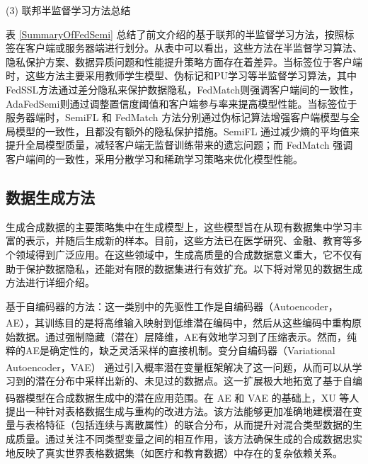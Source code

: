 (3) 联邦半监督学习方法总结

表 \ref{SummaryOfFedSemi} 总结了前文介绍的基于联邦的半监督学习方法，按照标签在客户端或服务器端进行划分。从表中可以看出，这些方法在半监督学习算法、隐私保护方案、数据异质问题和性能提升策略方面存在着差异。当标签位于客户端时，这些方法主要采用教师学生模型、伪标记和PU学习等半监督学习算法，其中FedSSL方法通过差分隐私来保护数据隐私，FedMatch则强调客户端间的一致性，AdaFedSemi则通过调整置信度阈值和客户端参与率来提高模型性能。当标签位于服务器端时，SemiFL 和 FedMatch 方法分别通过伪标记算法增强客户端模型与全局模型的一致性，且都没有额外的隐私保护措施。SemiFL 通过减少熵的平均值来提升全局模型质量，减轻客户端无监督训练带来的遗忘问题；而 FedMatch 强调客户端间的一致性，采用分散学习和稀疏学习策略来优化模型性能。



\subsection{数据生成方法}
生成合成数据的主要策略集中在生成模型上，这些模型旨在从现有数据集中学习丰富的表示，并随后生成新的样本。目前，这些方法已在医学研究、金融、教育等多个领域得到广泛应用。在这些领域中，生成高质量的合成数据意义重大，它不仅有助于保护数据隐私，还能对有限的数据集进行有效扩充。以下将对常见的数据生成方法进行详细介绍。

基于自编码器的方法：这一类别中的先驱性工作是自编码器（Autoencoder，AE）\textsuperscript{\cite{hinton2006reducing}}，其训练目的是将高维输入映射到低维潜在编码中，然后从这些编码中重构原始数据。通过强制隐藏（潜在）层降维，AE有效地学习到了压缩表示。然而，纯粹的AE是确定性的，缺乏灵活采样的直接机制。变分自编码器（Variational Autoencoder，VAE）\textsuperscript{\cite{kingma2013auto}} 通过引入概率潜在变量框架解决了这一问题，从而可以从学习到的潜在分布中采样出新的、未见过的数据点。这一扩展极大地拓宽了基于自编码器模型在合成数据生成中的潜在应用范围。在 AE 和 VAE 的基础上，XU 等人\textsuperscript{\cite{xu2019modeling}} 提出一种针对表格数据生成与重构的改进方法。该方法能够更加准确地建模潜在变量与表格特征（包括连续与离散属性）的联合分布，从而提升对混合类型数据的生成质量。通过关注不同类型变量之间的相互作用，该方法确保生成的合成数据忠实地反映了真实世界表格数据集（如医疗和教育数据）中存在的复杂依赖关系。

